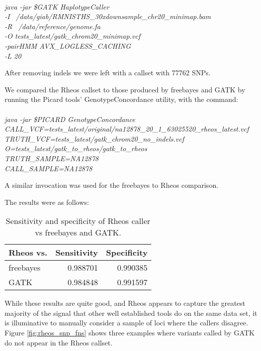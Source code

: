 \paragraph{}
\emph{java -jar \$GATK HaplotypeCaller \\
-I ~/data/giab/RMNISTHS\_30xdownsample\_chr20\_minimap.bam\\
 -R ~/data/reference/genome.fa  \\
 -O tests\_latest/gatk\_chrom20\_minimap.vcf  \\
 -pairHMM AVX\_LOGLESS\_CACHING \\
 -L 20
}

After removing indels we were left with a callset with 77762 SNPs.

We compared the Rheos callset to those produced by freebayes and GATK by running the Picard\autocite{Picard2018toolkit} tools' GenotypeConcordance utility, with the command:
\paragraph{}
\emph{ java -jar \$PICARD GenotypeConcordance \\
CALL\_VCF=tests\_latest/original/na12878\_20\_1\_63025520\_rheos\_latest.vcf  \\
TRUTH\_VCF=tests\_latest/gatk\_chrom20\_no\_indels.vcf   \\
O=tests\_latest/gatk\_to\_rheos/gatk\_to\_rheos \\
TRUTH\_SAMPLE=NA12878 \\
CALL\_SAMPLE=NA12878}

A similar invocation was used for the freebayes to Rheos comparison.

The results were as follows:

\begin{table}[!ht]
    \centering
    \caption{Sensitivity and specificity of Rheos caller vs freebayes and GATK.}
    \label{tab:rheos_vs_fb_and_gatk}
    {\begin{tabular}{l | r | r}
    \toprule
    Rheos vs. & Sensitivity & Specificity \\
    \midrule
    freebayes & 0.988701 & 0.990385\\
    GATK & 0.984848 & 0.991597\\
    \bottomrule
    \end{tabular}}
\end{table}

While these results are quite good, and Rheos appears to capture the greatest majority of the signal that other well established tools do on the same data set, it is illuminative to manually consider a sample of loci where the callers disagree. Figure \ref{fig:rheos_snp_fns} shows three examples where variants called by GATK do not appear in the Rheos callset. 

